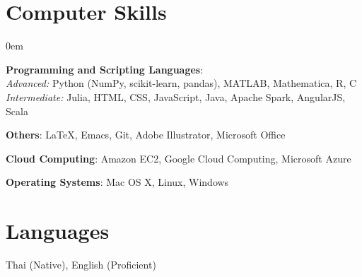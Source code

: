 \documentclass[margin,line]{res}
\begin{document}
\begin{resume}
\begin{itemize}[leftmargin=0cm, label={}]
\end{itemize}


\section{\sc Computer Skills}
\begin{itemize}[leftmargin=0cm, label={}]{
\itemsep0em
\item {\bf Programming and Scripting Languages}:\\
\textit{Advanced:} Python (\textsf{NumPy, scikit-learn, pandas}), MATLAB,  Mathematica, \textsf{R}, \textsf{C}\\
\textit{Intermediate:} \textsf{Julia}, \textsf{HTML}, \textsf{CSS}, \textsf{JavaScript}, \textsf{Java}, Apache Spark, AngularJS, Scala
\item {\bf Others}: \LaTeX, \textsf{Emacs}, \textsf{Git}, Adobe Illustrator, Microsoft Office
\item {\bf Cloud Computing}: Amazon EC2, Google Cloud Computing, Microsoft Azure
\item {\bf Operating Systems}: Mac OS X, Linux, Windows}
\end{itemize}


\section{\sc Languages}
Thai (Native), English (Proficient)

\end{resume}
\end{document}
